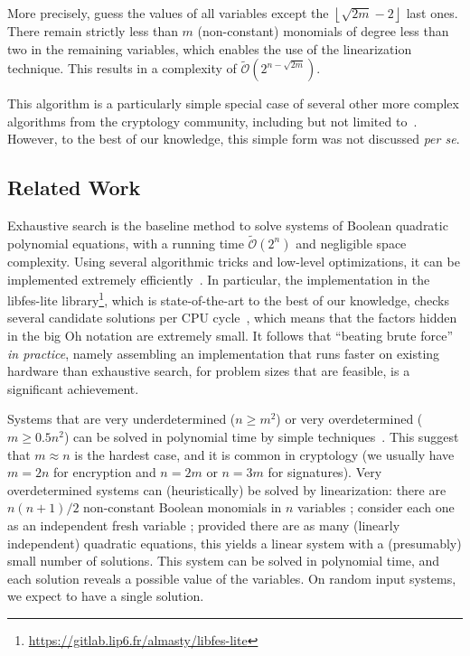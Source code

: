 \documentclass[a4paper,UKenglish,cleveref, autoref]{lipics-v2019}
\newcommand{\bigOsoft}[1]{\ensuremath{\mathcal{\tilde O}\left( #1 \right)} }
\begin{document}
More precisely, guess the values of all variables except the
$\left\lfloor \sqrt{2m} - 2 \right\rfloor$ last ones. There remain strictly less
than $m$ (non-constant) monomials of degree less than two in the remaining
variables, which enables the use of the linearization technique. This results in
a complexity of $\bigOsoft{2^{n - \sqrt{2m}}}$.

This algorithm is a particularly simple special case of several other more
complex algorithms from the cryptology community, including but not limited
to~\cite{CourtoisKPS00,BettaleFP09,JouxV17}. However, to the best of our
knowledge, this simple form was not discussed \textit{per se}.


\subsection{Related Work}
\label{sec:related}

Exhaustive search is the baseline method to solve systems of Boolean quadratic
polynomial equations, with a running time $\bigOsoft{2^n}$ and negligible space
complexity. Using several algorithmic tricks and low-level optimizations, it can
be implemented extremely efficiently~\cite{BouillaguetCCCNSY10}. In particular,
the implementation in the \textsf{libfes-lite}
library\footnote{\url{https://gitlab.lip6.fr/almasty/libfes-lite}}, which is
state-of-the-art to the best of our knowledge, checks several candidate
solutions per CPU cycle~\cite{BouillaguetCCCNSY10}, which means that the factors
hidden in the big Oh notation are extremely small. It follows that ``beating
brute force'' \emph{in practice}, namely assembling an implementation that runs
faster on existing hardware than exhaustive search, for problem sizes that are
feasible, is a significant achievement.

Systems that are very underdetermined ($n \geq m^2$) or very overdetermined
($m \geq 0.5 n^2$) can be solved in polynomial time by simple
techniques~\cite{CourtoisGMT02}. This suggest that $m \approx n$ is the hardest
case, and it is common in cryptology (we usually have $m=2n$ for encryption and
$n = 2m$ or $n=3m$ for signatures). Very overdetermined systems can
(heuristically) be solved by linearization: there are $n(n+1)/2$ non-constant
Boolean monomials in $n$ variables ; consider each one as an independent fresh
variable ; provided there are as many (linearly independent) quadratic
equations, this yields a linear system with a (presumably) small number of
solutions. This system can be solved in polynomial time, and each solution
reveals a possible value of the variables. On random input systems, we expect to
have a single solution.
\end{document}
